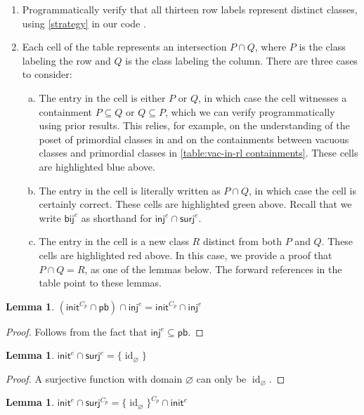 \documentclass{amsart}
\renewcommand\emptyset\varnothing
\newcommand{\inj}{\mathsf{inj}}
\newcommand{\surj}{\mathsf{surj}}
\newcommand{\bij}{\mathsf{bij}}
\newcommand{\init}{\mathsf{init}}
\newcommand{\pb}{\mathsf{pb}}
\DeclareMathOperator{\id}{id}
\numberwithin{equation}{section}
\newtheorem{lemma}[equation]{Lemma}
\theoremstyle{definition}
\begin{document}
\begin{enumerate}[(1)]
	\item Programmatically verify that all thirteen row labels represent distinct classes, using \cref{strategy} in our code \cite{code}.
	\item Each cell of the table represents an intersection $P \cap Q$, where $P$ is the class labeling the row and $Q$ is the class labeling the column. There are three cases to consider:
	      \begin{enumerate}[(a)]
		      \item The entry in the cell is either $P$ or $Q$, in which case the cell witnesses a containment $P \subseteq Q$ or $Q \subseteq P$, which we can verify programmatically using prior results. This relies, for example, on the understanding of the poset of primordial classes in  and on the containments between vacuous classes and primordial classes in \cref{table:vac-in-rl containments}. These cells are highlighted blue above.
		      \item The entry in the cell is literally written as $P \cap Q$, in which case the cell is certainly correct. These cells are highlighted green above. Recall that we write $\bij^e$ as shorthand for $\inj^e \cap \surj^e$.
		      \item The entry in the cell is a new class $R$ distinct from both $P$ and $Q$. These cells are highlighted red above. In this case, we provide a proof that $P \cap Q = R$, as one of the lemmas below. The forward references in the table point to these lemmas.
	      \end{enumerate}
\end{enumerate}

\begin{lemma}
	\label{(initCp cap pb) cap inje}
	$\left(\init^{C_p} \cap \pb\right) \cap \inj^e = \init^{C_p} \cap \inj^e$
\end{lemma}
\begin{proof}
	Follows from the fact that $\inj^e \subseteq \pb$.
\end{proof}

\begin{lemma}
	\label{inite cap surje}
	$\init^e \cap \surj^e = \{\id_\emptyset\}$
\end{lemma}

\begin{proof}
	A surjective function with domain $\emptyset$ can only be $\id_\emptyset$.
\end{proof}
\begin{lemma}
	\label{inite cap surjCp}
	$\init^e \cap \surj^{C_p} = \{\id_\emptyset\}^{C_p} \cap \init^e$
\end{lemma}
\end{document}
